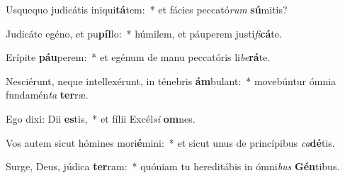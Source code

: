 \item Usquequo judicátis iniqui\textbf{tá}tem:~* et fácies peccató\textit{rum} \textbf{sú}mitis?
\item Judicáte egéno, et pu\textbf{píl}lo:~* húmilem, et páuperem justi\textit{fi}\textbf{cá}te.
\item Erípite \textbf{páu}perem:~* et egénum de manu peccatóris li\textit{be}\textbf{rá}te.
\item Nesciérunt, neque intellexérunt, in ténebris \textbf{ám}bulant:~* movebúntur ómnia fundamén\textit{ta} \textbf{ter}ræ.
\item Ego dixi: Dii \textbf{es}tis,~* et fílii Excél\textit{si} \textbf{om}nes.
\item Vos autem sicut hómines mori\textbf{é}mini:~* et sicut unus de princípibus \textit{ca}\textbf{dé}tis.
\item Surge, Deus, júdica \textbf{ter}ram:~* quóniam tu hereditábis in ómni\textit{bus} \textbf{Gén}tibus.
